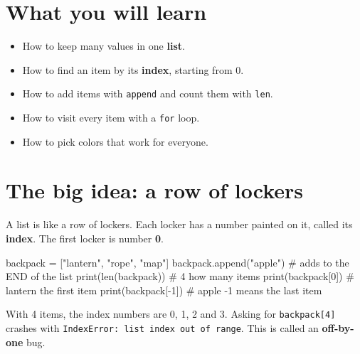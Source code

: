 
\section{What you will learn}
\begin{itemize}[leftmargin=1.2em]
  \item How to keep many values in one \textbf{list}.
  \item How to find an item by its \textbf{index}, starting from 0.
  \item How to add items with \texttt{append} and count them with \texttt{len}.
  \item How to visit every item with a \texttt{for} loop.
  \item How to pick colors that work for everyone.
\end{itemize}

\section{The big idea: a row of lockers}
A list is like a row of lockers. Each locker has a number painted on it, called its \textbf{index}.
The first locker is number \textbf{0}.

\begin{center}
\end{center}

\begin{pycode}
backpack = ["lantern", "rope", "map"]
backpack.append("apple")    # adds to the END of the list
print(len(backpack))        # 4   how many items
print(backpack[0])          # lantern   the first item
print(backpack[-1])         # apple   -1 means the last item
\end{pycode}
With 4 items, the index numbers are 0, 1, 2 and 3. Asking for \texttt{backpack[4]} crashes with
\texttt{IndexError: list index out of range}. This is called an \textbf{off-by-one} bug.

